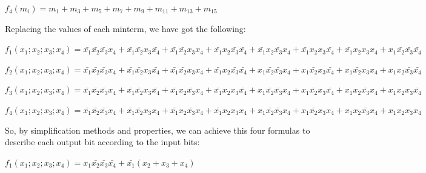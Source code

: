 \begin{center}
$f_{4}(m_{i})=m_{1}+m_{3}+m_{5}+m_{7}+m_{9}+m_{11}+m_{13}+m_{15}$
\par\end{center}

Replacing the values of each minterm, we have got the following:
\begin{center}
$f_{1}(x_{1};x_{2};x_{3};x_{4})=\bar{x_{1}}\bar{x_{2}}\bar{x_{3}}x_{4}+\bar{x_{1}}\bar{x_{2}}x_{3}\bar{x_{4}}+\bar{x_{1}}\bar{x_{2}}x_{3}x_{4}+\bar{x_{1}}x_{2}\bar{x_{3}}\bar{x_{4}}+\bar{x_{1}}x_{2}\bar{x_{3}}x_{4}+\bar{x_{1}}x_{2}x_{3}\bar{x_{4}}+\bar{x_{1}}x_{2}x_{3}x_{4}+x_{1}\bar{x_{2}}\bar{x_{3}}\bar{x_{4}}$
\par\end{center}

\begin{center}
$f_{2}(x_{1};x_{2};x_{3};x_{4})=\bar{x_{1}}\bar{x_{2}}\bar{x_{3}}x_{4}+\bar{x_{1}}\bar{x_{2}}x_{3}\bar{x_{4}}+\bar{x_{1}}\bar{x_{2}}x_{3}x_{4}+\bar{x_{1}}x_{2}\bar{x_{3}}\bar{x_{4}}+x_{1}\bar{x_{2}}\bar{x_{3}}x_{4}+x_{1}\bar{x_{2}}x_{3}\bar{x_{4}}+x_{1}\bar{x_{2}}x_{3}x_{4}+x_{1}x_{2}\bar{x_{3}}\bar{x_{4}}$
\par\end{center}

\begin{center}
$f_{3}(x_{1};x_{2};x_{3};x_{4})=\bar{x_{1}}\bar{x_{2}}\bar{x_{3}}x_{4}+\bar{x_{1}}\bar{x_{2}}x_{3}\bar{x_{4}}+\bar{x_{1}}x_{2}\bar{x_{3}}x_{4}+\bar{x_{1}}x_{2}x_{3}\bar{x_{4}}+x_{1}\bar{x_{2}}\bar{x_{3}}x_{4}+x_{1}\bar{x_{2}}x_{3}\bar{x_{4}}+x_{1}x_{2}\bar{x_{3}}x_{4}+x_{1}x_{2}x_{3}\bar{x_{4}}$
\par\end{center}

\begin{center}
$f_{4}(x_{1};x_{2};x_{3};x_{4})=\bar{x_{1}}\bar{x_{2}}\bar{x_{3}}x_{4}+\bar{x_{1}}\bar{x_{2}}x_{3}x_{4}+\bar{x_{1}}x_{2}\bar{x_{3}}x_{4}+\bar{x_{1}}x_{2}x_{3}x_{4}+x_{1}\bar{x_{2}}\bar{x_{3}}x_{4}+x_{1}\bar{x_{2}}x_{3}x_{4}+x_{1}x_{2}\bar{x_{3}}x_{4}+x_{1}x_{2}x_{3}x_{4}$
\par\end{center}

So, by simplification methods and properties, we can achieve this
four formulas to describe each output bit according to the input bits:
\begin{center}
$f_{1}(x_{1};x_{2};x_{3};x_{4})=x_{1}\bar{x_{2}}\bar{x_{3}}\bar{x_{4}}+\bar{x_{1}}(x_{2}+x_{3}+x_{4})$
\par\end{center}

